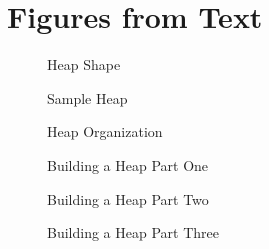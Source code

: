 \documentclass[letterpaper,10pt,english]{sphinxmanual}
\begin{document}
\begin{sphinxVerbatim}[commandchars=\\\{\},numbers=left,firstnumber=1,stepnumber=1]



\end{sphinxVerbatim}


\section{Figures from Text}
\label{\detokenize{chap8/chap8:figures-from-text}}
\begin{figure}[htbp]
\centering
\capstart

\noindent{}
\caption{Heap Shape}\label{\detokenize{chap8/chap8:id1}}\end{figure}

\begin{figure}[htbp]
\centering
\capstart

\noindent{}
\caption{Sample Heap}\label{\detokenize{chap8/chap8:id2}}\end{figure}

\begin{figure}[htbp]
\centering
\capstart

\noindent{}
\caption{Heap Organization}\label{\detokenize{chap8/chap8:id3}}\end{figure}

\begin{figure}[htbp]
\centering
\capstart

\noindent{}
\caption{Building a Heap Part One}\label{\detokenize{chap8/chap8:id4}}\end{figure}

\begin{figure}[htbp]
\centering
\capstart

\noindent{}
\caption{Building a Heap Part Two}\label{\detokenize{chap8/chap8:id5}}\end{figure}

\begin{figure}[htbp]
\centering
\capstart

\noindent{}
\caption{Building a Heap Part Three}\label{\detokenize{chap8/chap8:id6}}\end{figure}
\end{document}
